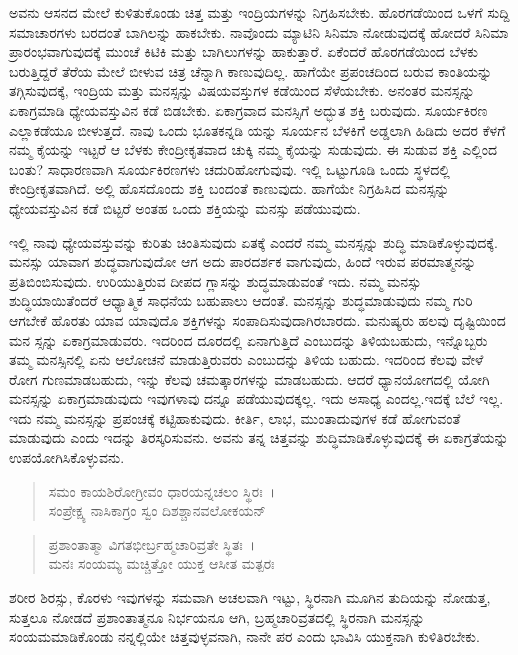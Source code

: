 ಅವನು ಆಸನದ ಮೇಲೆ ಕುಳಿತುಕೊಂಡು ಚಿತ್ತ ಮತ್ತು ಇಂದ್ರಿಯಗಳನ್ನು ನಿಗ್ರಹಿಸಬೇಕು. ಹೊರಗಡೆಯಿಂದ ಒಳಗೆ ಸುದ್ದಿ ಸಮಾಚಾರಗಳು ಬರದಂತೆ ಬಾಗಿಲನ್ನು ಹಾಕಬೇಕು. ನಾವೊಂದು ಮ್ಯಾಟಿನಿ ಸಿನಿಮಾ ನೋಡುವುದಕ್ಕೆ ಹೋದರೆ ಸಿನಿಮಾ ಪ್ರಾರಂಭವಾಗುವುದಕ್ಕೆ ಮುಂಚೆ ಕಿಟಿಕಿ ಮತ್ತು ಬಾಗಿಲುಗಳನ್ನು ಹಾಕುತ್ತಾರೆ. ಏಕೆಂದರೆ ಹೊರಗಡೆಯಿಂದ ಬೆಳಕು ಬರುತ್ತಿದ್ದರೆ ತೆರೆಯ ಮೇಲೆ ಬೀಳುವ ಚಿತ್ರ ಚೆನ್ನಾಗಿ ಕಾಣುವುದಿಲ್ಲ. ಹಾಗೆಯೇ ಪ್ರಪಂಚದಿಂದ ಬರುವ ಕಾಂತಿಯನ್ನು ತಗ್ಗಿಸುವುದಕ್ಕೆ, ಇಂದ್ರಿಯ ಮತ್ತು ಮನಸ್ಸನ್ನು ವಿಷಯವಸ್ತುಗಳ ಕಡೆಯಿಂದ ಸೆಳೆಯಬೇಕು. ಅನಂತರ ಮನಸ್ಸನ್ನು ಏಕಾಗ್ರಮಾಡಿ ಧ್ಯೇಯವಸ್ತುವಿನ ಕಡೆ ಬಿಡಬೇಕು. ಏಕಾಗ್ರವಾದ ಮನಸ್ಸಿಗೆ ಅದ್ಭುತ ಶಕ್ತಿ ಬರುವುದು. ಸೂರ್ಯಕಿರಣ ಎಲ್ಲಾಕಡೆಯೂ ಬೀಳುತ್ತದೆ. ನಾವು ಒಂದು ಭೂತಕನ್ನಡಿ ಯನ್ನು ಸೂರ್ಯನ ಬೆಳಕಿಗೆ ಅಡ್ಡಲಾಗಿ ಹಿಡಿದು ಅದರ ಕೆಳಗೆ ನಮ್ಮ ಕೈಯನ್ನು ಇಟ್ಟರೆ ಆ ಬೆಳಕು ಕೇಂದ್ರೀಕೃತವಾದ ಚುಕ್ಕಿ ನಮ್ಮ ಕೈಯನ್ನು ಸುಡುವುದು. ಈ ಸುಡುವ ಶಕ್ತಿ ಎಲ್ಲಿಂದ ಬಂತು? ಸಾಧಾರಣವಾಗಿ ಸೂರ್ಯಕಿರಣಗಳು ಚದುರಿಹೋಗುವುವು. ಇಲ್ಲಿ ಒಟ್ಟುಗೂಡಿ ಒಂದು ಸ್ಥಳದಲ್ಲಿ ಕೇಂದ್ರೀಕೃತವಾಗಿದೆ. ಅಲ್ಲಿ ಹೊಸದೊಂದು ಶಕ್ತಿ ಬಂದಂತೆ ಕಾಣುವುದು. ಹಾಗೆಯೇ ನಿಗ್ರಹಿಸಿದ ಮನಸ್ಸನ್ನು ಧ್ಯೇಯವಸ್ತುವಿನ ಕಡೆ ಬಿಟ್ಟರೆ ಅಂತಹ ಒಂದು ಶಕ್ತಿಯನ್ನು ಮನಸ್ಸು ಪಡೆಯುವುದು.

ಇಲ್ಲಿ ನಾವು ಧ್ಯೇಯವಸ್ತುವನ್ನು ಕುರಿತು ಚಿಂತಿಸುವುದು ಏತಕ್ಕೆ ಎಂದರೆ ನಮ್ಮ ಮನಸ್ಸನ್ನು ಶುದ್ಧಿ ಮಾಡಿಕೊಳ್ಳುವುದಕ್ಕೆ. ಮನಸ್ಸು ಯಾವಾಗ ಶುದ್ಧವಾಗುವುದೋ ಆಗ ಅದು ಪಾರದರ್ಶಕ ವಾಗುವುದು, ಹಿಂದೆ ಇರುವ ಪರಮಾತ್ಮನನ್ನು ಪ್ರತಿಬಿಂಬಿಸುವುದು. ಉರಿಯುತ್ತಿರುವ ದೀಪದ ಗ್ಲಾಸನ್ನು ಶುದ್ಧಮಾಡುವಂತೆ ಇದು. ನಮ್ಮ ಮನಸ್ಸು ಶುದ್ಧಿಯಾಯಿತೆಂದರೆ ಆಧ್ಯಾತ್ಮಿಕ ಸಾಧನೆಯ ಬಹುಪಾಲು ಆದಂತೆ. ಮನಸ್ಸನ್ನು ಶುದ್ಧಮಾಡುವುದು ನಮ್ಮ ಗುರಿ ಆಗಬೇಕೆ ಹೊರತು ಯಾವ ಯಾವುದೊ ಶಕ್ತಿಗಳನ್ನು ಸಂಪಾದಿಸುವುದಾಗಿರಬಾರದು. ಮನುಷ್ಯರು ಹಲವು ದೃಷ್ಟಿಯಿಂದ ಮನ ಸ್ಸನ್ನು ಏಕಾಗ್ರಮಾಡುವರು. ಇದರಿಂದ ದೂರದಲ್ಲಿ ಏನಾಗುತ್ತಿದೆ ಎಂಬುದನ್ನು ತಿಳಿಯಬಹುದು, ಇನ್ನೊಬ್ಬರು ತಮ್ಮ ಮನಸ್ಸಿನಲ್ಲಿ ಏನು ಆಲೋಚನೆ ಮಾಡುತ್ತಿರುವರು ಎಂಬುದನ್ನು ತಿಳಿಯ ಬಹುದು. ಇದರಿಂದ ಕೆಲವು ವೇಳೆ ರೋಗ ಗುಣಮಾಡಬಹುದು, ಇನ್ನು ಕೆಲವು ಚಮತ್ಕಾರಗಳನ್ನು ಮಾಡಬಹುದು. ಆದರೆ ಧ್ಯಾನಯೋಗದಲ್ಲಿ ಯೋಗಿ ಮನಸ್ಸನ್ನು ಏಕಾಗ್ರಮಾಡುವುದು ಇವುಗಳಾವು ದನ್ನೂ ಪಡೆಯುವುದಕ್ಕಲ್ಲ. ಇದು ಅಸಾಧ್ಯ ಎಂದಲ್ಲ.ಇದಕ್ಕೆ ಬೆಲೆ ಇಲ್ಲ. ಇದು ನಮ್ಮ ಮನಸ್ಸನ್ನು ಪ್ರಪಂಚಕ್ಕೆ ಕಟ್ಟಿಹಾಕುವುದು. ಕೀರ್ತಿ, ಲಾಭ, ಮುಂತಾದುವುಗಳ ಕಡೆ ಹೋಗುವಂತೆ ಮಾಡುವುದು ಎಂದು ಇದನ್ನು ತಿರಸ್ಕರಿಸುವನು. ಅವನು ತನ್ನ ಚಿತ್ತವನ್ನು ಶುದ್ಧಿಮಾಡಿಕೊಳ್ಳುವುದಕ್ಕೆ ಈ ಏಕಾಗ್ರತೆಯನ್ನು ಉಪಯೋಗಿಸಿಕೊಳ್ಳುವನು.

\begin{verse}
ಸಮಂ ಕಾಯಶಿರೋಗ್ರೀವಂ ಧಾರಯನ್ನಚಲಂ ಸ್ಥಿರಃ~।\\ಸಂಪ್ರೇಕ್ಷ್ಯ ನಾಸಿಕಾಗ್ರಂ ಸ್ವಂ ದಿಶಶ್ಚಾನವಲೋಕಯನ್ 
\end{verse}

\begin{verse}
ಪ್ರಶಾಂತಾತ್ಮಾ ವಿಗತಭೀರ್ಬ್ರಹ್ಮಚಾರಿವ್ರತೇ ಸ್ಥಿತಃ~।\\ಮನಃ ಸಂಯಮ್ಯ ಮಚ್ಚಿತ್ತೋ ಯುಕ್ತ ಆಸೀತ ಮತ್ಪರಃ 
\end{verse}

{\small ಶರೀರ ಶಿರಸ್ಸು, ಕೊರಳು ಇವುಗಳನ್ನು ಸಮವಾಗಿ ಅಚಲವಾಗಿ ಇಟ್ಟು, ಸ್ಥಿರನಾಗಿ ಮೂಗಿನ ತುದಿಯನ್ನು ನೋಡುತ್ತ, ಸುತ್ತಲೂ ನೋಡದೆ ಪ್ರಶಾಂತಾತ್ಮನೂ ನಿರ್ಭಯನೂ ಆಗಿ, ಬ್ರಹ್ಮಚಾರಿವ್ರತದಲ್ಲಿ ಸ್ಥಿರನಾಗಿ ಮನಸ್ಸನ್ನು ಸಂಯಮಮಾಡಿಕೊಂಡು ನನ್ನಲ್ಲಿಯೇ ಚಿತ್ತವುಳ್ಳವನಾಗಿ, ನಾನೇ ಪರ ಎಂದು ಭಾವಿಸಿ ಯುಕ್ತನಾಗಿ ಕುಳಿತಿರಬೇಕು.}

